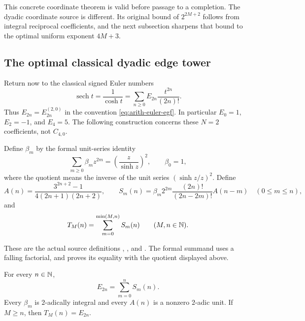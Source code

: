This concrete coordinate theorem is valid before passage to a completion.
The dyadic coordinate source is different.  Its original bound of
$2^{2M+2}$ follows from integral reciprocal coefficients, and the next
subsection sharpens that bound to the optimal uniform exponent $4M+3$.

\subsection{The optimal classical dyadic edge tower}

Return now to the classical signed Euler numbers
\[
 \operatorname{sech}t=\frac1{\cosh t}
       =\sum_{n\ge0}E_{2n}\frac{t^{2n}}{(2n)!}.
\]
Thus $E_{2n}=E_{2n}^{(2,0)}$ in the convention
\eqref{eq:arith-euler-egf}.  In particular $E_0=1$, $E_2=-1$, and $E_4=5$.
The following construction concerns these $N=2$ coefficients, not $C_{4,0}$.

\begin{definition}\label{def:arith-truncation}
Define $\beta_m$ by the formal unit-series identity
\[
 \sum_{m\ge0}\beta_m z^{2m}=\left(\frac{z}{\sinh z}\right)^2,
 \qquad \beta_0=1,
\]
where the quotient means the inverse of the unit series
$(\sinh z/z)^2$.  Define
\[
 A(n)=\frac{3^{2n+2}-1}{4(2n+1)(2n+2)},\qquad
 S_m(n)=\beta_m2^{2m}\frac{(2n)!}{(2n-2m)!}A(n-m)
       \quad(0\le m\le n),
\]
and
\begin{equation}\label{eq:arith-tm}
 T_M(n)=\sum_{m=0}^{\min(M,n)}S_m(n)\qquad(M,n\in\mathbb N).
\end{equation}
\end{definition}

These are the actual source definitions
,
, and
.
The formal summand uses a falling factorial, and
proves its equality with the quotient displayed above.

\begin{lemma}
\label{lem:arith-reconstruction}
For every $n\in\mathbb N$,
\[
 E_{2n}=\sum_{m=0}^{n}S_m(n).
\]
Every $\beta_m$ is $2$-adically integral and every $A(n)$ is a nonzero
$2$-adic unit.  If $M\ge n$, then $T_M(n)=E_{2n}$.
\end{lemma}

